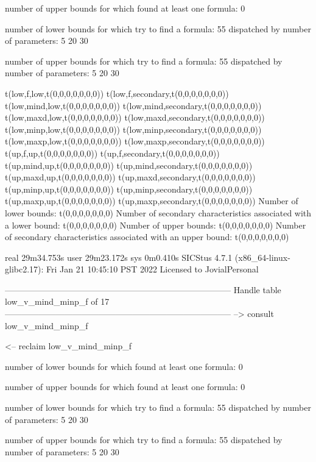 number of upper bounds for which found at least one formula: 0

number of lower bounds for which try to find a formula: 55
dispatched by number of parameters: 5  20  30

number of upper bounds for which try to find a formula: 55
dispatched by number of parameters: 5  20  30

t(low,f,low,t(0,0,0,0,0,0,0))
t(low,f,secondary,t(0,0,0,0,0,0,0))
t(low,mind,low,t(0,0,0,0,0,0,0))
t(low,mind,secondary,t(0,0,0,0,0,0,0))
t(low,maxd,low,t(0,0,0,0,0,0,0))
t(low,maxd,secondary,t(0,0,0,0,0,0,0))
t(low,minp,low,t(0,0,0,0,0,0,0))
t(low,minp,secondary,t(0,0,0,0,0,0,0))
t(low,maxp,low,t(0,0,0,0,0,0,0))
t(low,maxp,secondary,t(0,0,0,0,0,0,0))
t(up,f,up,t(0,0,0,0,0,0,0))
t(up,f,secondary,t(0,0,0,0,0,0,0))
t(up,mind,up,t(0,0,0,0,0,0,0))
t(up,mind,secondary,t(0,0,0,0,0,0,0))
t(up,maxd,up,t(0,0,0,0,0,0,0))
t(up,maxd,secondary,t(0,0,0,0,0,0,0))
t(up,minp,up,t(0,0,0,0,0,0,0))
t(up,minp,secondary,t(0,0,0,0,0,0,0))
t(up,maxp,up,t(0,0,0,0,0,0,0))
t(up,maxp,secondary,t(0,0,0,0,0,0,0))
Number of lower bounds:                                             t(0,0,0,0,0,0,0)
Number of secondary characteristics associated with a lower bound:  t(0,0,0,0,0,0,0)
Number of upper bounds:                                             t(0,0,0,0,0,0,0)
Number of secondary characteristics associated with an upper bound: t(0,0,0,0,0,0,0)

real	29m34.753s
user	29m23.172s
sys	0m0.410s
SICStus 4.7.1 (x86_64-linux-glibc2.17): Fri Jan 21 10:45:10 PST 2022
Licensed to JovialPersonal


--------------------------------------------------------------------------------
Handle table low_v_mind_minp_f of 17
--------------------------------------------------------------------------------
--> consult low_v_mind_minp_f

<-- reclaim low_v_mind_minp_f

number of lower bounds for which found at least one formula: 0

number of upper bounds for which found at least one formula: 0

number of lower bounds for which try to find a formula: 55
dispatched by number of parameters: 5  20  30

number of upper bounds for which try to find a formula: 55
dispatched by number of parameters: 5  20  30

